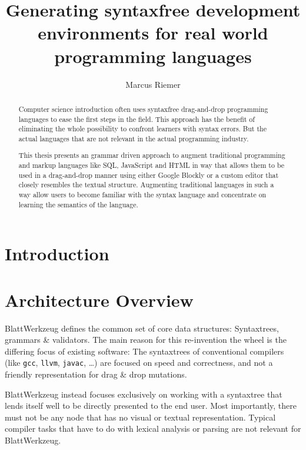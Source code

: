 \documentclass[sigconf,review=true]{acmart}
\begin{document}
\title[]{Generating syntaxfree development environments for real world programming languages}

\author{Marcus Riemer}

\begin{abstract}
  Computer science introduction often uses syntaxfree drag-and-drop programming languages to ease the first steps in the field. This approach has the benefit of eliminating the whole possibility to confront learners with syntax errors. But the actual languages that are not relevant in the actual programming industry.

  This thesis presents an grammar driven approach to augment traditional programming and markup languages like SQL, JavaScript and HTML in way that allows them to be used in a drag-and-drop manner using either Google Blockly or a custom editor that closely resembles the textual structure. Augmenting traditional languages in such a way allow users to become familiar with the syntax language and concentrate on learning the semantics of the language.
\end{abstract}

\maketitle

\section{Introduction}

\section{Architecture Overview}

Blatt\-Werkzeug defines the common set of core data structures: Syntax\-trees, grammars \& validators. The main reason for this re-invention the wheel is the differing focus of existing software: The syntaxtrees of conventional compilers (like \texttt{gcc}, \texttt{llvm}, \texttt{javac}, …) are focused on speed and correctness, and not a friendly representation for drag \& drop mutations.

BlattWerkzeug instead focuses exclusively on working with a syntaxtree that lends itself well to be directly presented to the end user. Most importantly, there must not be any node that has no visual or textual representation. Typical compiler tasks that have to do with lexical analysis or parsing are not relevant for Blatt\-Werkzeug.
\end{document}
